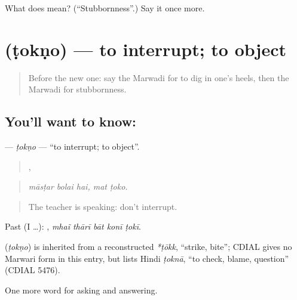 \begin{tcolorbox}[breakable,colback=teal!4,colframe=teal!35!black,title={Before you move on}]
What does  mean? (\textquotedblleft{}Stubbornness\textquotedblright{}.) Say it once more.
\end{tcolorbox}
\section[\texorpdfstring{\mw{टोकणो} (ṭokṇo)}{टोकणो (ṭokṇo)}]{ (ṭokṇo) — to interrupt; to object}

\label{lesson:MW-C269-tokno}



\begin{quote}
Before the new one: say the Marwadi for to dig in one's heels, then the Marwadi for stubbornness.
\end{quote}

\subsection*{You'll want to know: }
\textbf{} — \emph{ṭokṇo} — \textquotedblleft{}to interrupt; to object\textquotedblright{}.

\begin{quote}
  ,  
\end{quote}

\begin{quote}
\emph{māsṭar bolai hai, mat ṭoko.}
\end{quote}

\begin{quote}
The teacher is speaking: don't interrupt.
\end{quote}

Past (I …):     , \emph{mhaĩ thārī bāt konī ṭokī}.

\begin{cousinweb}
\textbf{} (\emph{ṭokṇo}) is inherited from a reconstructed \emph{*ṭōkk}, \textquotedblleft{}strike, bite\textquotedblright{}; CDIAL gives no Marwari form in this entry, but lists Hindi \emph{ṭoknā}, \textquotedblleft{}to check, blame, question\textquotedblright{} (CDIAL 5476).
\end{cousinweb}

\begin{grammarlens}[title={What you've built}]
One more word for asking and answering.
\end{grammarlens}

